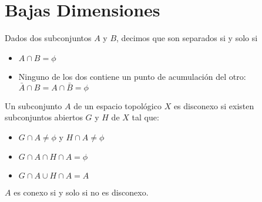 \documentclass{./Topologia.tex}
\begin{document}
\chapter{Bajas Dimensiones}
Dados dos subconjuntos $A$ y $B$, decimos que son separados si y solo si
\begin{itemize}
	\item $A \cap B= \phi$
	\item Ninguno de los dos contiene un punto de acumulación del otro: $\bar{A}\cap B = A \cap \bar{B} = \phi$ 
\end{itemize}
\begin{defin}
Un subconjunto $A$ de un espacio topológico $X$ es disconexo si existen subconjuntos abiertos $G$ y $H$ de $X$ tal que:
\begin{itemize}
	\item $G \cap A \neq \phi$ y $H \cap A \neq \phi$
	\item $G \cap A \cap H \cap A = \phi$
	\item $G \cap A \cup H \cap A = A$ 
\end{itemize}
$A$ es conexo si y solo si no es disconexo. 
\end{defin}
\end{document}
